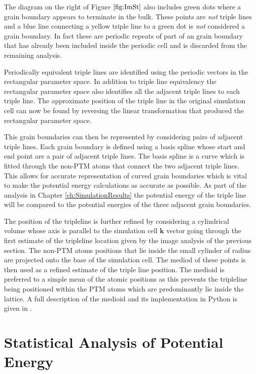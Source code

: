 \documentclass[12pt,a4paper,openany]{report}
\begin{document}
The diagram on the right of Figure $\ref{fig:ImSt}$ also includes green dots  where a grain boundary appears to terminate in the bulk. These points are \emph{not} triple lines and a blue line connecting a yellow triple line to a green dot is \emph{not} considered a grain boundary. In fact these are periodic repeats of part of an grain boundary that has already been included inside the periodic cell and is discarded from the remaining analysis.
 
Periodically equivalent triple lines are identified using the periodic vectors in the rectangular parameter space. In addition to triple line equivalency the rectangular parameter space also identifies all the adjacent triple lines to each triple line. 
The approximate position of the triple line in the original simulation cell can now be found by reversing the linear transformation that produced the rectangular parameter space.

This grain boundaries can then be represented by considering pairs of adjacent triple lines. Each grain boundary is defined using a basis spline whose start and end point are a pair of adjacent triple lines. The basis spline is a curve which is fitted through the non-PTM atoms that connect the two adjacent triple lines. This allows for accurate representation of curved grain boundaries which is vital to make the potential energy calculations as accurate as possible. As part of the analysis in Chapter \ref{ch:SimulationResults} the potential energy of the triple line will be compared to the potential energies of the three adjacent grain boundaries.  

The position of the tripleline is further refined by considering a cylindrical volume whose axis is parallel to the simulation cell $\mathbf{k}$ vector going through the first estimate of the tripleline location given by the image analysis of the previous section. The non-PTM atoms positions that lie inside the small cylinder of radius are projected onto the base of the simulation cell. The mediod of these points is then used as a refined estimate of the triple line position. The medioid is preferred to a simple mean of the atomic positions as this prevents the tripleline being positioned within the PTM atoms which are predominantly lie inside the lattice. A full description of the medioid and its implementation in Python is given in \cite{Bauckhage2015}. 

\newpage
\section{Statistical Analysis of Potential Energy}
\end{document}
